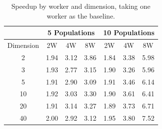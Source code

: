 \documentclass[review]{elsarticle}
\begin{document}
\begin{table}[h!tbp]
  \caption{Speedup by worker and dimension, taking one worker as the baseline.}
  \label{tab:speedup-table}
  \vspace{0.25cm}
  \centering

  \begin{tabular}{c|r|r|r|r|r|r|}
  \cline{2-7}
  \multicolumn{1}{l|}{}           & \multicolumn{3}{c|}{5 Populations}                                          & \multicolumn{3}{c|}{10 Populations}                                         \\ \hline
  \multicolumn{1}{|l|}{Dimension} & \multicolumn{1}{c|}{2W} & \multicolumn{1}{c|}{4W} & \multicolumn{1}{c|}{8W} & \multicolumn{1}{c|}{2W} & \multicolumn{1}{c|}{4W} & \multicolumn{1}{c|}{8W} \\ \hline
  \multicolumn{1}{|c|}{2}         & 1.94                    & 3.12                    & 3.86                    & 1.84                    & 3.38                    & 5.98                    \\ \hline
  \multicolumn{1}{|c|}{3}         & 1.93                    & 2.77                    & 3.15                    & 1.90                    & 3.26                    & 5.96                    \\ \hline
  \multicolumn{1}{|c|}{5}         & 1.91                    & 2.90                    & 3.09                    & 1.91                    & 3.46                    & 6.14                    \\ \hline
  \multicolumn{1}{|c|}{10}        & 1.92                    & 3.03                    & 3.30                    & 1.90                    & 3.61                    & 6.41                    \\ \hline
  \multicolumn{1}{|c|}{20}        & 1.91                    & 3.14                    & 3.27                    & 1.89                    & 3.73                    & 6.71                    \\ \hline
  \multicolumn{1}{|c|}{40}        & 2.00                    & 2.92                    & 3.12                    & 1.95                    & 3.80                    & 7.52                    \\ \hline
  \end{tabular}
\end{table}
%
\end{document}
